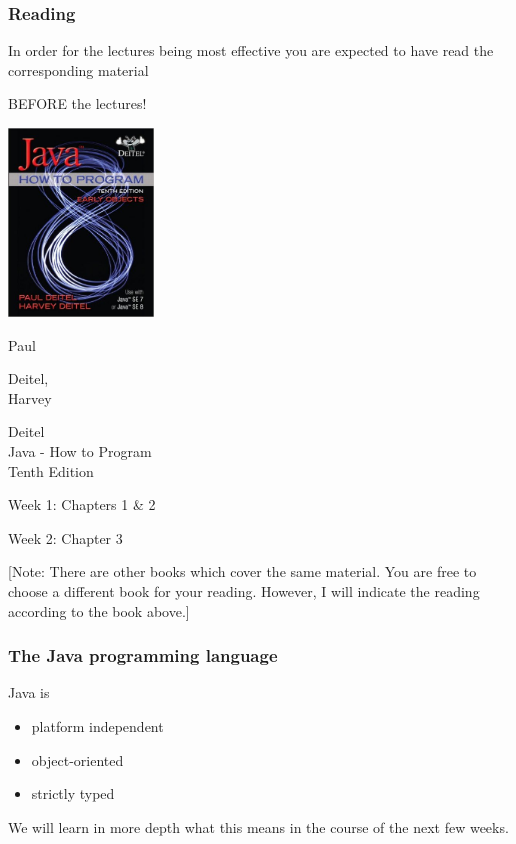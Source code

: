 \documentclass{beamer}
\def\mcolor#1#2{\rule{0ex}{0ex}\color{#1}#2\color{black}{}}
\begin{document}
\begin{frame}
\frametitle{Reading} 
In order for the lectures being most effective you are expected
to have read the corresponding material \mcolor{red}{BEFORE} the lectures!\bigskip

\begin{minipage}{0.50\textwidth}
\includegraphics[height=5cm]{deitel10} 
\end{minipage}
\begin{minipage}{0.45\textwidth}
{\Large Paul \mcolor{blue}{Deitel},\\ Harvey \mcolor{blue}{Deitel}\\
 Java - How to Program\\
Tenth Edition}

\mcolor{blue}{Week 1: Chapters 1 \& 2}\\
\mcolor{blue}{Week 2: Chapter 3}
\end{minipage}\bigskip

{\small [Note: There are other books which cover the same material. You are
free to choose a different book for your reading. However, I will
indicate the reading according to the book above.]}
\end{frame}

\begin{frame}
\frametitle{The Java programming language}
\Large
Java is
\begin{itemize}
  \item platform independent
  \item object-oriented
  \item strictly typed
\end{itemize}\bigskip

We will learn in more depth what this means in the course of the next
few weeks.
\end{frame}
\end{document}
